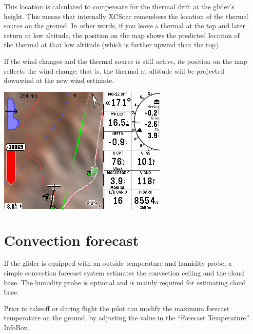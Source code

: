 \documentclass[a4paper,12pt]{refrep}
\newcommand{\InfoBox}[0]{{InfoBox}}
\begin{document}
  This location is calculated to compensate for the thermal drift at
  the glider's height.  This means that internally XCSoar remembers
  the location of the thermal source on the ground.  In other words,
  if you leave a thermal at the top and later return at low altitude,
  the position on the map shows the predicted location of the thermal
  at that low altitude (which is further upwind than the top).  

  If the wind changes and the thermal source is still active, its
  position on the map reflects the wind change; that is, the thermal
  at altitude will be projected downwind at the new wind estimate.

\begin{center}
\includegraphics[angle=0,width=\linewidth,keepaspectratio='true']{figures/shot-tlocator-cruise.png}
\end{center}

\section{Convection forecast}\label{sec:convection-forecast}

If the glider is equipped with an outside temperature and humidity
probe, a simple convection forecast system estimates the convection
ceiling and the cloud base.  The humidity probe is optional and is
mainly required for estimating cloud base.

Prior to takeoff or during flight the pilot can modify the maximum
forecast temperature on the ground, by adjusting the value in the
``Forecast Temperature'' {\InfoBox}.
\end{document}
